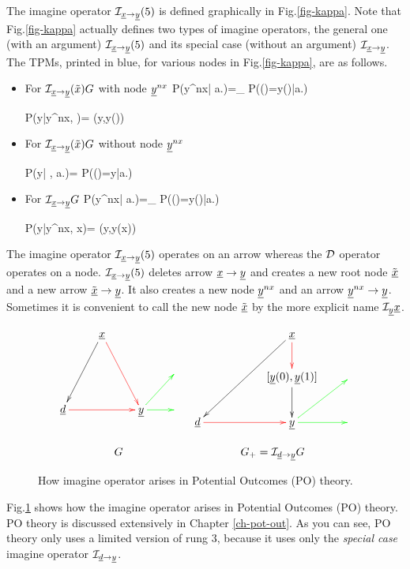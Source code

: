 The imagine operator  ${\cal I}_{{\underline{x}}\rightarrow {\underline{y}}}(5)$
is defined graphically in Fig.\ref{fig-kappa}.
Note that Fig.\ref{fig-kappa}
actually defines two types 
of imagine operators, the general one (with an argument)
${\cal I}_{{\underline{x}}\rightarrow {\underline{y}}}(5)$
and its special case (without an argument)
${\cal I}_{{\underline{x}}\rightarrow {\underline{y}}}$.
The TPMs, printed in blue, 
for various nodes in
Fig.\ref{fig-kappa}, are as follows.



\begin{itemize}
\item
For ${\cal I}_{{\underline{x}}\rightarrow {\underline{y}}}(\tilde{x})G$ 
with node ${\underline{y}}^{nx}$
\beq\color{blue}
P(y^{nx}| a.)=\prod_{}
P(\rvy()=y()|a.)
\eeq

\beq\color{blue}
P(y|y^{nx}, )=
\delta(y,y())
\eeq

\item
For ${\cal I}_{{\underline{x}}\rightarrow {\underline{y}}}(\tilde{x})G$ 
without node ${\underline{y}}^{nx}$

\beq\color{blue}
P(y| , a.)=
P(\rvy()=y|a.)
\eeq

\item
For ${\cal I}_{{\underline{x}}\rightarrow {\underline{y}}}G$
\beq\color{blue}
P(y^{nx}| a.)=\prod_{}
P(\rvy()=y()|a.)
\eeq

\beq\color{blue}
P(y|y^{nx}, x)=
\delta(y,y(x))
\eeq
\end{itemize}
The imagine operator 
${\cal I}_{{\underline{x}}\rightarrow{\underline{y}}}(5)$
operates on an arrow
whereas the 
${\cal D}$ operator
 operates on a node.
${\cal I}_{{\underline{x}}\rightarrow{\underline{y}}}(5)$
deletes
arrow ${\underline{x}}\rightarrow{\underline{y}}$
and
creates a new root node 
$\tilde{{\underline{x}}}$
and a new arrow
$\tilde{{\underline{x}}}\rightarrow {\underline{y}}$. 
It also creates
a new node ${\underline{y}}^{nx}$
and an arrow ${\underline{y}}^{nx}\rightarrow {\underline{y}}$.
Sometimes it is convenient
to call the new node
 $\tilde{{\underline{x}}}$
by the more
explicit name ${\cal I}_{\underline{y}}{\underline{x}}$.


\begin{figure}[h!]
$$
\begin{array}{ccccc}
\xymatrix{
&\rvx\ar@[red][ddr]\ar[ddl]
\\
&&&
\\
\rvd\ar@[red][rr]
&
&\rvy\ar@[green][r]
\ar@[green][ur]
&
}
&
\xymatrix{
&&\rvx\ar[ddll]\ar@[red][d]
\\
&&[\rvy(0),\rvy(1)]\ar[d]
&
\\
\rvd\ar@[red][rr]
&
&\rvy\ar@[green][r]
\ar@[green][ur]
&
}
\\
\\
G&G_+=\cali_{\rvd\rarrow\rvy}G
\end{array}
$$
\caption{How 
 imagine operator 
arises in 
Potential Outcomes (PO)
theory.
} 
\label{fig-counterf-G-im-y0-y1}
\end{figure}
Fig.\ref{fig-counterf-G-im-y0-y1}
shows how the
imagine operator arises
in Potential Outcomes (PO) theory.
PO theory is discussed extensively
in Chapter \ref{ch-pot-out}.
As you can see, PO theory
only uses a limited version
of rung 3, because it uses only
the {\it special case}
imagine operator 
${\cal I}_{{\underline{d}}\rightarrow {\underline{y}}}$.


